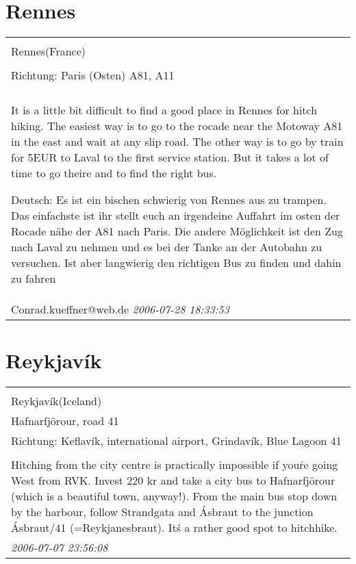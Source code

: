 \documentclass[a4paper,12pt]{article}
\begin{document}
\section{Rennes}
\begin{tabular}{|p{13cm}|}
\hline\\
Rennes(France)\\
\\
Richtung: Paris (Osten) A81, A11 \\
\hline\\
It is a little bit difficult to find a good place in Rennes for hitch hiking. The easiest way is to go to the rocade near the Motoway A81 in the east and wait at any slip road.
The other way is to go by train for 5EUR to Laval to the first service station. But it takes a lot of time to go theire and to find the right bus.

Deutsch: Es ist ein bischen schwierig von Rennes aus zu trampen. Das einfachste ist ihr stellt euch an irgendeine Auffahrt im osten der Rocade nähe der A81 nach Paris. Die andere Möglichkeit ist den Zug nach Laval zu nehmen und es bei der Tanke an der Autobahn zu versuchen. Ist aber langwierig den richtigen Bus zu finden und dahin zu fahren \\
Conrad.kueffner@web.de \textit{ 2006-07-28 18:33:53 }\\\hline
\end{tabular}


\section{Reykjavík}
\begin{tabular}{|p{13cm}|}
\hline\\
Reykjavík(Iceland)\\
Hafnarfjörour, road 41\\
Richtung: Keflavík, international airport, Grindavík, Blue Lagoon 41 \\
\hline\\
Hitching from the city centre is practically impossible if you\'re going West from RVK. Invest 220 kr and take a city bus to Hafnarfjörour (which is a beautiful town, anyway!). From the main bus stop down by the harbour, follow Strandgata and Ásbraut to the junction Ásbraut/41 (=Reykjanesbraut). It\'s a rather good spot to hitchhike. \\
\textit{ 2006-07-07 23:56:08 }\\\hline
\end{tabular}
\end{document}
